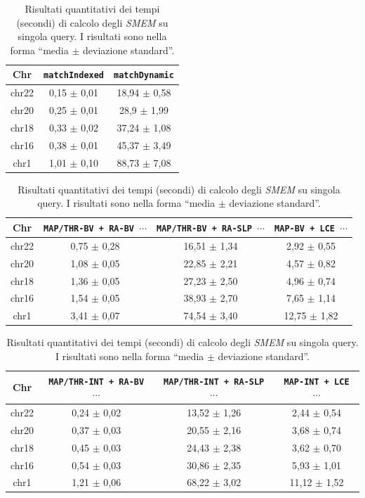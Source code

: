 \begin{table}
  \centering
  \caption{Risultati quantitativi dei tempi (secondi) di calcolo degli
    \textit{SMEM} su singola query. I risultati sono nella forma ``media $\pm$
    deviazione standard''.}  
  \label{tab:exetimesingle}
  \footnotesize
  \begin{tabular}{c||c|c} 
    \textbf{Chr}
    & \textbf{\texttt{matchIndexed}}
    & \textbf{\texttt{matchDynamic}}\\
    \hline
    \hline
    chr22 & 0,15 $\pm$ 0,01 & 18,94 $\pm$ 0,58 \\
    chr20 & 0,25 $\pm$ 0,01 & 28,9 $\pm$ 1,99 \\
    chr18 & 0,33 $\pm$ 0,02 & 37,24 $\pm$ 1,08  \\
    chr16 & 0,38 $\pm$ 0,01 & 45,37 $\pm$ 3,49 \\
    chr1 & 1,01 $\pm$ 0,10 & 88,73 $\pm$ 7,08
  \end{tabular}
  \vspace{+3mm}
  \vspace{+1mm}
  \begin{tabular}{c||c|c|c} 
    \textbf{Chr}
    & \textbf{\texttt{MAP/THR-BV + RA-BV $\cdots$}}
    & \textbf{\texttt{MAP/THR-BV + RA-SLP $\cdots$}}
    & \textbf{\texttt{MAP-BV + LCE $\cdots$}}\\
    \hline
    \hline
    chr22 & 0,75 $\pm$ 0,28 & 16,51 $\pm$ 1,34 & 2,92 $\pm$ 0,55\\
    chr20 & 1,08 $\pm$ 0,05 & 22,85 $\pm$ 2,21 & 4,57 $\pm$ 0,82\\
    chr18 & 1,36 $\pm$ 0,05 & 27,23 $\pm$ 2,50 & 4,96 $\pm$ 0,74 \\
    chr16 & 1,54 $\pm$ 0,05 & 38,93 $\pm$ 2,70 & 7,65 $\pm$ 1,14 \\
    chr1 & 3,41 $\pm$ 0,07 & 74,54 $\pm$ 3,40 & 12,75 $\pm$ 1,82 
  \end{tabular}
  \vspace{+3mm}
  \vspace{+1mm}
  \begin{tabular}{c||c|c|c} 
    \textbf{Chr}
    & \textbf{\texttt{MAP/THR-INT + RA-BV $\cdots$}}
    & \textbf{\texttt{MAP/THR-INT + RA-SLP $\cdots$}}
    & \textbf{\texttt{MAP-INT + LCE $\cdots$}}\\
    \hline
    \hline
    chr22 & 0,24 $\pm$ 0,02 & 13,52 $\pm$ 1,26 & 2,44 $\pm$ 0,54 \\
    chr20 & 0,37 $\pm$ 0,03 & 20,55 $\pm$ 2,16 & 3,68 $\pm$ 0,74 \\
    chr18 & 0,45 $\pm$ 0,03 & 24,43 $\pm$ 2,38 & 3,62 $\pm$ 0,70 \\
    chr16 & 0,54 $\pm$ 0,03 & 30,86 $\pm$ 2,35 & 5,93 $\pm$ 1,01 \\
    chr1 & 1,21 $\pm$ 0,06 & 68,22 $\pm$ 3,02 & 11,12 $\pm$ 1,52


\end{tabular}
\end{table}
